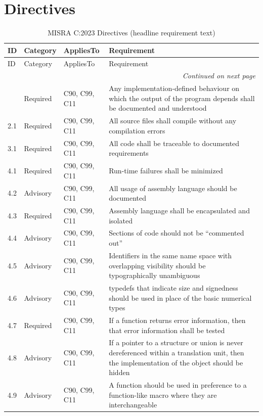 \documentclass[11pt]{article}
\begin{document}
\section{Directives}
{\small\setlength{\tabcolsep}{2pt}\renewcommand{\arraystretch}{1.05}%
\begin{longtable}{@{}p{1.2cm}p{1.8cm}p{2.2cm}p{10.2cm}@{}}
\caption{MISRA C:2023 Directives (headline requirement text)}\\
\toprule
ID & Category & AppliesTo & Requirement \\
\midrule
\endfirsthead
\toprule
ID & Category & AppliesTo & Requirement \\
\midrule
\endhead
\midrule
\multicolumn{4}{r}{\emph{Continued on next page}} \\
\midrule
\endfoot
\bottomrule
\endlastfoot
1.1 & Required & C90, C99, C11 & Any implementation-defined behaviour on which the output of the program depends shall be documented and understood \\
2.1 & Required & C90, C99, C11 & All source files shall compile without any compilation errors \\
3.1 & Required & C90, C99, C11 & All code shall be traceable to documented requirements \\
4.1 & Required & C90, C99, C11 & Run-time failures shall be minimized \\
4.2 & Advisory & C90, C99, C11 & All usage of assembly language should be documented \\
4.3 & Required & C90, C99, C11 & Assembly language shall be encapsulated and isolated \\
4.4 & Advisory & C90, C99, C11 & Sections of code should not be ``commented out'' \\
4.5 & Advisory & C90, C99, C11 & Identifiers in the same name space with overlapping visibility should be typographically unambiguous \\
4.6 & Advisory & C90, C99, C11 & typedefs that indicate size and signedness should be used in place of the basic numerical types \\
4.7 & Required & C90, C99, C11 & If a function returns error information, then that error information shall be tested \\
4.8 & Advisory & C90, C99, C11 & If a pointer to a structure or union is never dereferenced within a translation unit, then the implementation of the object should be hidden \\
4.9 & Advisory & C90, C99, C11 & A function should be used in preference to a function-like macro where they are interchangeable \\

\end{longtable}}
\end{document}
